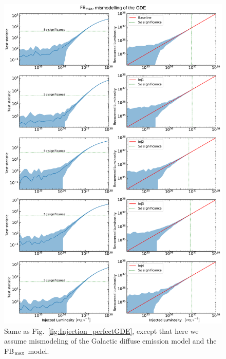 \documentclass[doublespace,nopageskip]{VTthesis} %
\begin{document}
\begin{appendices}
\begin{figure}
    \begin{center}
    \includegraphics[scale = 0.42]{Figures/CTA/all-TS-mis-True-Fermi-min-False.pdf}
    \caption{Same as Fig.~\ref{fig:Injection_perfectGDE}, except that here we assume mismodeling of the Galactic diffuse emission model and the FB$_{\rm max}$ model.}\label{fig:InjectionmismodelingFBmax}
    \end{center}
\end{figure}


\end{appendices}
\end{document}
